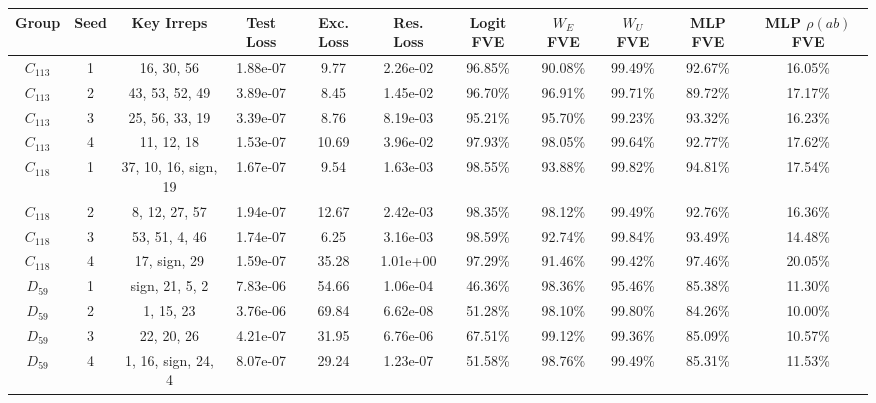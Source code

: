 \begin{tabular}{ccccccccccc}
\toprule
    Group & Seed &                      Key Irreps & Test Loss & Exc. Loss & Res. Loss & Logit FVE & $W_E$ FVE & $W_U$ FVE & MLP FVE & MLP $\rho(ab)$ FVE \\
\midrule
$C_{113}$ &    1 &                      16, 30, 56 &  1.88e-07 &      9.77 &  2.26e-02 &   96.85\% &   90.08\% &   99.49\% & 92.67\% &            16.05\% \\
$C_{113}$ &    2 &                  43, 53, 52, 49 &  3.89e-07 &      8.45 &  1.45e-02 &   96.70\% &   96.91\% &   99.71\% & 89.72\% &            17.17\% \\
$C_{113}$ &    3 &                  25, 56, 33, 19 &  3.39e-07 &      8.76 &  8.19e-03 &   95.21\% &   95.70\% &   99.23\% & 93.32\% &            16.23\% \\
$C_{113}$ &    4 &                      11, 12, 18 &  1.53e-07 &     10.69 &  3.96e-02 &   97.93\% &   98.05\% &   99.64\% & 92.77\% &            17.62\% \\
$C_{118}$ &    1 &            37, 10, 16, sign, 19 &  1.67e-07 &      9.54 &  1.63e-03 &   98.55\% &   93.88\% &   99.82\% & 94.81\% &            17.54\% \\
$C_{118}$ &    2 &                   8, 12, 27, 57 &  1.94e-07 &     12.67 &  2.42e-03 &   98.35\% &   98.12\% &   99.49\% & 92.76\% &            16.36\% \\
$C_{118}$ &    3 &                   53, 51, 4, 46 &  1.74e-07 &      6.25 &  3.16e-03 &   98.59\% &   92.74\% &   99.84\% & 93.49\% &            14.48\% \\
$C_{118}$ &    4 &                    17, sign, 29 &  1.59e-07 &     35.28 &  1.01e+00 &   97.29\% &   91.46\% &   99.42\% & 97.46\% &            20.05\% \\
 $D_{59}$ &    1 &                  sign, 21, 5, 2 &  7.83e-06 &     54.66 &  1.06e-04 &   46.36\% &   98.36\% &   95.46\% & 85.38\% &            11.30\% \\
 $D_{59}$ &    2 &                       1, 15, 23 &  3.76e-06 &     69.84 &  6.62e-08 &   51.28\% &   98.10\% &   99.80\% & 84.26\% &            10.00\% \\
 $D_{59}$ &    3 &                      22, 20, 26 &  4.21e-07 &     31.95 &  6.76e-06 &   67.51\% &   99.12\% &   99.36\% & 85.09\% &            10.57\% \\
 $D_{59}$ &    4 &              1, 16, sign, 24, 4 &  8.07e-07 &     29.24 &  1.23e-07 &   51.58\% &   98.76\% &   99.49\% & 85.31\% &            11.53\% \\

\end{tabular}
